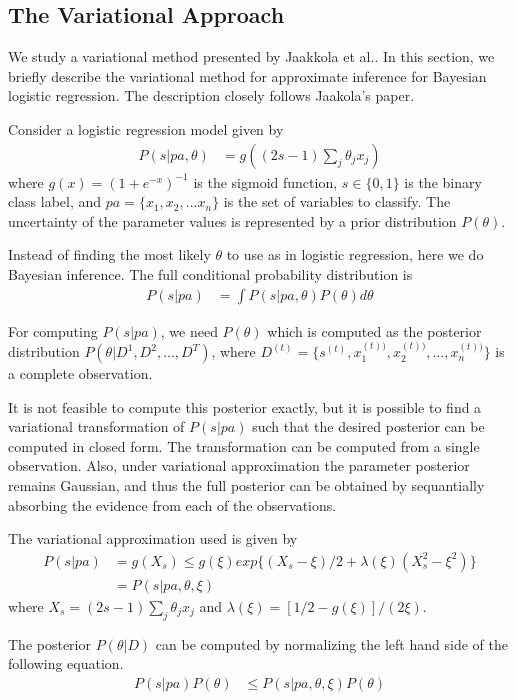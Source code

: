 \subsection{The Variational Approach}
We study a variational method presented by Jaakkola et al.\cite{Jaakkola96avariational}. In this section, we briefly describe the variational method for approximate inference for Bayesian logistic regression. The description closely follows Jaakola's paper.

Consider a logistic regression model given by 
\begin{align}
  P(s|pa, \theta) &= g((2s - 1)\sum_j\theta_jx_j)
\end{align}
where $g(x) = (1 + e^{-x})^{-1}$ is the sigmoid function, $s \in \{0, 1\}$ is the binary class label, and $pa = \{x_1, x_2, ... x_n\}$ is the set of variables to classify. The uncertainty of the parameter values is represented by a prior distribution $P(\theta)$.

Instead of finding the most likely $\theta$ to use as in logistic regression, here we do Bayesian inference. The full conditional probability distribution is
\begin{align}
P(s|pa) &= \int P(s|pa, \theta)P(\theta)d\theta
\end{align}

For computing $P(s|pa)$, we need $P(\theta)$ which is computed as the posterior distribution $P(\theta| D^1, D^2, ..., D^T)$, where $D^{(t)} = \{s^{(t)}, x^{(t))}_1, x^{(t))}_2, ..., x^{(t))}_n\}$ is a complete observation. 

It is not feasible to compute this posterior exactly, but it is possible to find a variational transformation of $P(s|pa)$ such that the desired posterior can be computed in closed form. The transformation can be computed from a single observation. Also, under variational approximation the parameter posterior remains Gaussian, and thus the full posterior can be obtained by sequantially absorbing the evidence from each of the observations.

The variational approximation used is given by
\begin{align}
  P(s|pa) &= g(X_s) \leq g(\xi)exp\{(X_s - \xi)/2 + \lambda(\xi)(X_s^2 - \xi^2)\}\\
  &= P(s|pa, \theta, \xi)
\end{align}
where $X_s = (2s - 1)\sum_j\theta_jx_j$ and $\lambda(\xi) = [1/2 - g(\xi)]/(2\xi)$.

The posterior $P(\theta|D)$ can be computed by normalizing the left hand side of the following equation.
\begin{align}
\label{eq:variational}
P(s|pa)P(\theta) &\leq P(s|pa, \theta, \xi)P(\theta)
\end{align}

